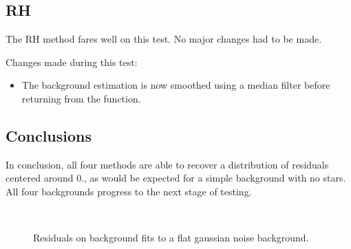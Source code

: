 \documentclass[10pt, a4paper]{article}
\begin{document}
\subsection{RH}
The RH method fares well on this test. No major changes had to be made.

Changes made during this test:
\begin{itemize}
\item The background estimation is now smoothed using a median filter before returning from the function.
\end{itemize}


\subsection{Conclusions}
In conclusion, all four methods are able to recover a distribution of residuals centered around 0., as would be expected for a simple background with no stars. All four backgrounds progress to the next stage of testing.

\begin{figure}[!ht]
   \centering
   \quad
   \\
   \quad
   \caption{Residuals on background fits to a flat gaussian noise background.}
\end{figure}
\end{document}
